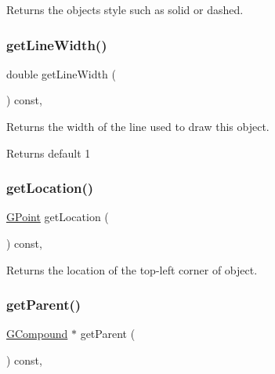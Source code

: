 Returns the object\textquotesingle{}s style such as solid or dashed. 

\mbox{\label{classGObject_a85ff266dc3eb63d9f2d8e5a4487fd3c0}} 
\subsubsection{\texorpdfstring{get\+Line\+Width()}{getLineWidth()}}
{\footnotesize\ttfamily double get\+Line\+Width (\begin{DoxyParamCaption}{ }\end{DoxyParamCaption}) const\hspace{0.3cm}{\ttfamily [virtual]}, {\ttfamily [inherited]}}



Returns the width of the line used to draw this object. 

\begin{DoxyReturn}{Returns}
default 1 
\end{DoxyReturn}
\mbox{\label{classGObject_a4f83802015511edeb63b892830812c11}} 
\subsubsection{\texorpdfstring{get\+Location()}{getLocation()}}
{\footnotesize\ttfamily \mbox{\hyperlink{classGPoint}{G\+Point}} get\+Location (\begin{DoxyParamCaption}{ }\end{DoxyParamCaption}) const\hspace{0.3cm}{\ttfamily [virtual]}, {\ttfamily [inherited]}}



Returns the location of the top-\/left corner of object. 

\mbox{\label{classGObject_a3e53cef70541b1a14eade4ad0984d0b4}} 
\subsubsection{\texorpdfstring{get\+Parent()}{getParent()}}
{\footnotesize\ttfamily \mbox{\hyperlink{classGCompound}{G\+Compound}} $\ast$ get\+Parent (\begin{DoxyParamCaption}{ }\end{DoxyParamCaption}) const\hspace{0.3cm}{\ttfamily [virtual]}, {\ttfamily [inherited]}}



